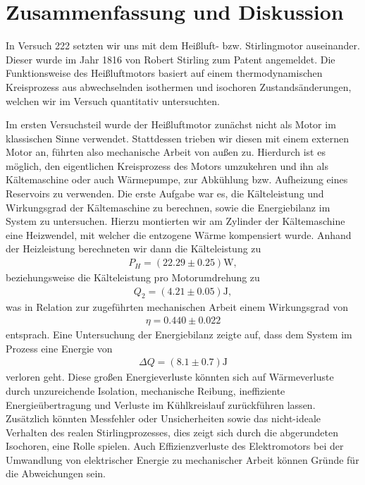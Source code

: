 \section{Zusammenfassung und Diskussion}

In Versuch 222 setzten wir uns mit dem Heißluft- bzw. Stirlingmotor auseinander. Dieser wurde im Jahr 1816 von Robert Stirling zum Patent angemeldet. Die Funktionsweise des Heißluftmotors basiert auf einem thermodynamischen Kreisprozess aus abwechselnden isothermen und isochoren Zustandsänderungen, welchen wir im Versuch quantitativ untersuchten.

Im ersten Versuchsteil wurde der Heißluftmotor zunächst nicht als Motor im klassischen Sinne verwendet. Stattdessen trieben wir diesen mit einem externen Motor an, führten also mechanische Arbeit von außen zu. Hierdurch ist es möglich, den eigentlichen Kreisprozess des Motors umzukehren und ihn als Kältemaschine oder auch Wärmepumpe, zur Abkühlung bzw. Aufheizung eines Reservoirs zu verwenden. Die erste Aufgabe war es, die Kälteleistung und Wirkungsgrad der Kältemaschine zu berechnen, sowie die Energiebilanz im System zu untersuchen. Hierzu montierten wir am Zylinder der Kältemaschine eine Heizwendel, mit welcher die entzogene Wärme kompensiert wurde. Anhand der Heizleistung berechneten wir dann die Kälteleistung zu
\begin{align*}
  P_H = (22.29 \pm 0.25) \si{\watt},
\end{align*}
beziehungsweise die Kälteleistung pro Motorumdrehung zu
\begin{align*}
  Q_2 = (4.21 \pm 0.05)\si{\joule},
\end{align*}
was in Relation zur zugeführten mechanischen Arbeit einem Wirkungsgrad von
\begin{align*}
  \eta = 0.440 \pm 0.022
\end{align*}
entsprach. Eine Untersuchung der Energiebilanz zeigte auf, dass dem System im Prozess eine Energie von
\begin{align*}
  \Delta Q = (8.1 \pm 0.7)\si{\joule}
\end{align*}
verloren geht. Diese großen Energieverluste könnten sich auf Wärmeverluste durch unzureichende Isolation, mechanische Reibung, ineffiziente Energieübertragung und Verluste im Kühlkreislauf zurückführen lassen. Zusätzlich könnten Messfehler oder Unsicherheiten sowie das nicht-ideale Verhalten des realen Stirlingprozesses, dies zeigt sich durch die abgerundeten Isochoren, eine Rolle spielen. Auch Effizienzverluste des Elektromotors bei der Umwandlung von elektrischer Energie zu mechanischer Arbeit können Gründe für die Abweichungen sein.

